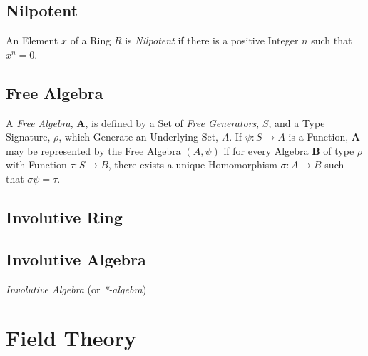 \subsection{Nilpotent}\label{sec:nilpotent}

An Element $x$ of a Ring $R$ is \emph{Nilpotent} if there is a
positive Integer $n$ such that $x^n = 0$.



\subsection{Free Algebra}\label{sec:free_algebra}

A \emph{Free Algebra}, $\mathbf{A}$, is defined by a Set of \emph{Free
  Generators}, $S$, and a Type Signature, $\rho$, which Generate an
Underlying Set, $A$. If $\psi : S \rightarrow A$ is a Function,
$\mathbf{A}$ may be represented by the Free Algebra $(A,\psi)$ if for
every Algebra $\mathbf{B}$ of type $\rho$ with Function $\tau : S
\rightarrow B$, there exists a unique Homomorphism $\sigma : A
\rightarrow B$ such that $\sigma\psi = \tau$.



\subsection{Involutive Ring}\label{sec:involutive_ring}

\subsection{Involutive Algebra}\label{sec:involutive_algebra}

\emph{Involutive Algebra} (or \emph{*-algebra})



\section{Field Theory}\label{sec:field_theory}

